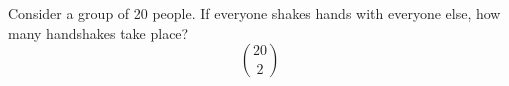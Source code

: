 \item Consider a group of 20 people. If everyone shakes hands with everyone else, how many handshakes take place?
\[ \binom{20}{2} \]